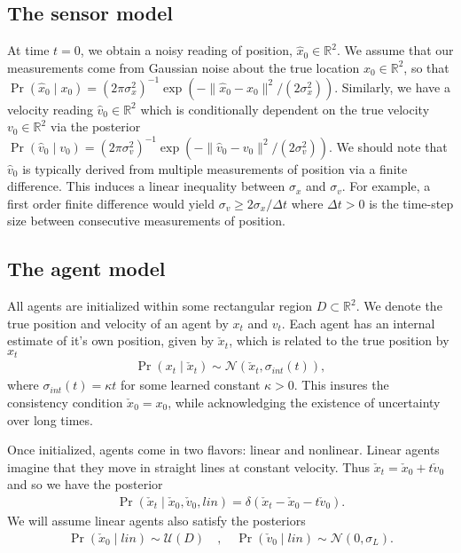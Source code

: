 \documentclass[conference]{IEEEtran}
\begin{document}
\subsection{The sensor model}
At time $t=0$, we obtain a noisy reading of position, $\hat{x}_0 \in \mathbb{R}^2$.
We assume that our measurements come from Gaussian noise about the true location $x_0 \in \mathbb{R}^2$,
so that $\Pr(\hat{x}_0 \mid x_0 ) = (2\pi \sigma_x^2)^{-1} \exp( - \| \hat{x}_0 - x_0 \|^2 / (2 \sigma_x^2) )$.
Similarly, we have a velocity reading $\hat{v}_0 \in \mathbb{R}^2$ which is conditionally dependent on the true velocity $v_0 \in \mathbb{R}^2$
via the posterior $\Pr( \hat{v}_0 \mid v_0 ) = (2\pi \sigma_v^2)^{-1} \exp( - \| \hat{v}_0 - v_0 \|^2 / (2 \sigma_v^2) )$.
We should note that $\hat{v}_0$ is typically derived from multiple measurements of position via a finite difference.
This induces a linear inequality between $\sigma_x$ and $\sigma_v$.
For example, a first order finite difference would yield $\sigma_v \geq 2 \sigma_x / \Delta t$ where $\Delta t > 0$ is the time-step size between consecutive measurements of position.

\subsection{The agent model}
All agents are initialized within some rectangular region $D \subset \mathbb{R}^2$.
We denote the true position and velocity of an agent by $x_t$ and $v_t$.
Each agent has an internal estimate of it's own position, given by $\check{x}_t$, which is related to the true position by $x_t$
\begin{align*}
	\Pr( x_t \mid \check{x}_t ) \sim \mathcal{N}( \check{x}_t, \sigma_{int}(t)),
\end{align*}
where $\sigma_{int}(t) = \kappa t$ for some learned constant $\kappa > 0$.
This insures the consistency condition $\check{x}_0 = x_0$, while acknowledging the existence of uncertainty over long times.

Once initialized, agents come in two flavors: linear and nonlinear.
Linear agents imagine that they move in straight lines at constant velocity.
Thus $\check{x}_t = \check{x}_0 + t \check{v}_0$ and so we have the posterior
\begin{align*}
	\Pr( \check{x}_t \mid \check{x}_0, \check{v}_0, lin) = \delta( \check{x}_t - \check{x}_0 - t \check{v}_0 ).
\end{align*}
We will assume linear agents also satisfy the posteriors
\begin{align*}
	\Pr( \check{x}_0 \mid lin ) \sim \mathcal{U}( D)\quad,\quad \Pr( \check{v}_0 \mid lin ) \sim \mathcal{N}( 0 , \sigma_L).
\end{align*}
\end{document}
